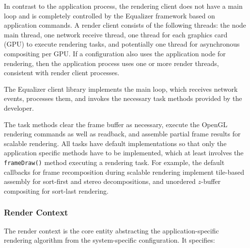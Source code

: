 In contrast to the application process, the rendering client does not have a
main loop and is completely controlled by the Equalizer framework based on
application commands. A render client consists of the following threads: the
node main thread, one network receive thread, one thread for each graphics card
(GPU) to execute rendering tasks, and potentially one thread for asynchronous
compositing per GPU. If a configuration also uses the application node for
rendering, then the application process uses one or more render threads,
consistent with render client processes.

The Equalizer client library implements the main loop, which receives network
events, processes them, and invokes the necessary task methods provided by the
developer.

The task methods clear the frame buffer as necessary, execute the OpenGL
rendering commands as well as readback, and assemble partial frame results for
scalable rendering. All tasks have default implementations so that only the
application specific methods have to be implemented, which at least involves
the {\tt frameDraw()} method executing a rendering task. For example, the
default callbacks for frame recomposition during scalable rendering implement
tile-based assembly for sort-first and stereo decompositions, and unordered
$z$-buffer compositing for sort-last rendering.

\subsubsection{Render Context}

The render context is the core entity abstracting the application-specific
rendering algorithm from the system-specific configuration. It specifies:

